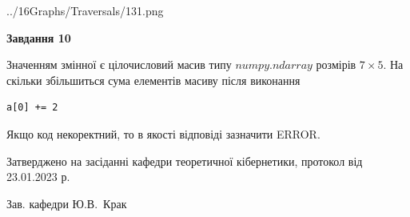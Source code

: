 \documentclass[12pt, ukrainian]{article}
\begin{document}
{\begin {large}
\begin{center}
	{../16Graphs/Traversals/131.png}
\end{center}\par
\newpage

{\begin {center}\textbf{Завдання 10}\end {center}}\par
Значенням змінної  є цілочисловий масив типу $numpy.ndarray$ розмірів $7{\times}5$. На скільки збільшиться сума елементів масиву  після виконання
\begin{verbatim}
a[0] += 2
\end{verbatim}


Якщо код некоректний, то в якості відповіді зазначити ERROR.\par
\newpage


\end {large}
}
{\smallskip \begin {small} Затверджено на засіданні кафедри теоретичної кібернетики, протокол  від   23.01.2023 р.\par\smallskip\smallskip
{\parbox {6.5 cm}{Зав. кафедри \dotfill Ю.В.~Крак}} \end{small}}
\end{document}
